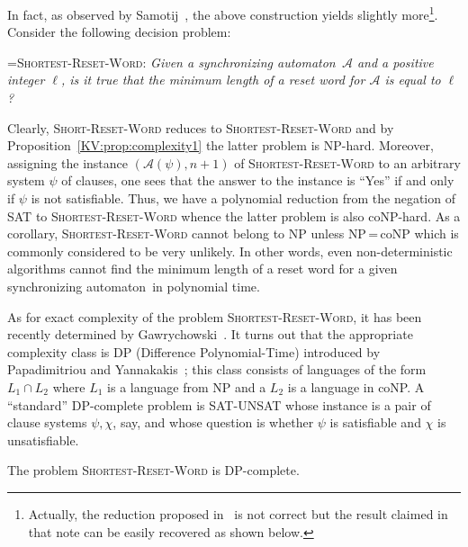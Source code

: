 \documentclass{irmaart}
\newcommand{\san}{synchronizing au\-tom\-a\-ton}
\begin{document}
In fact, as observed by Samotij~\cite{Samotij:2007}, the above
construction yields slightly more\footnote{Actually, the reduction
proposed in~\cite{Samotij:2007} is not correct but the result
claimed in that note can be easily recovered as shown below.}.
Consider the following decision
problem:

\smallskip

\hangindent=\parindent \noindent \textsc{Shortest-Reset-Word:}
\emph{Given a \san\ $\mathcal{A}$ and a positive integer $\ell$,
is it true that the minimum length of a reset word for
$\mathcal{A}$ is equal to $\ell$?}

\smallskip

\noindent Clearly, \textsc{Short-Reset-Word} reduces to
\textsc{Shortest-Reset-Word} and by
Proposition~\ref{KV:prop:complexity1} the latter problem is
\textsf{NP}-hard. Moreover, assigning the instance
$(\mathcal{A}(\psi),n+1)$ of \textsc{Shortest-Reset-Word} to an
arbitrary system $\psi$ of clauses, one sees that the answer to
the instance is ``Yes'' if and only if $\psi$ is not satisfiable.
Thus, we have a polynomial reduction from the negation of
\textsc{SAT} to \textsc{Shortest-Reset-Word} whence the latter
problem is also \textsf{coNP}-hard. As a corollary,
\textsc{Shortest-Reset-Word} cannot belong to \textsf{NP} unless
\textsf{NP}\,=\,\textsf{coNP} which is commonly considered to be
very unlikely. In other words, even non-deterministic algorithms
cannot find the minimum length of a reset word for a given \san\
in polynomial time.

As for exact complexity of the problem
\textsc{Shortest-Reset-Word}, it has been recently determined by
Gawrychowski~\cite{Gawrychowski:2008}. It turns out that the
appropriate complexity class is \textsf{DP} (\textsf{Difference
Polynomial-Time}) introduced by Papadimitriou and
Yannakakis~\cite{Papadimitriou&Yannakakis:1984}; this class
consists of languages of the form $L_1\cap L_2$ where $L_1$ is a
language from \textsf{NP} and a $L_2$ is a language in
\textsf{coNP}. A ``standard'' \textsf{DP}-complete problem is
\textsc{SAT-UNSAT} whose instance is a pair of clause systems
$\psi,\chi$, say, and whose question is whether $\psi$ is
satisfiable and $\chi$ is unsatisfiable.

\begin{proposition}
\label{KV:prop:complexity2} The problem
\textsc{Shortest-Reset-Word} is \textsf{DP}-complete.
\end{proposition}
\end{document}
